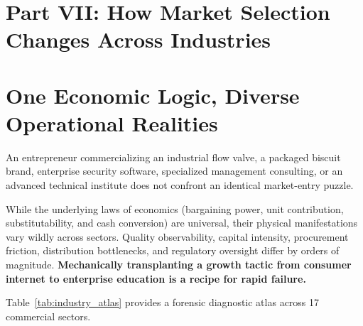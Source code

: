 \section*{Part VII: How Market Selection Changes Across Industries}

\section{One Economic Logic, Diverse Operational Realities}

An entrepreneur commercializing an industrial flow valve, a packaged biscuit brand, enterprise security software, specialized management consulting, or an advanced technical institute does not confront an identical market-entry puzzle.

While the underlying laws of economics (bargaining power, unit contribution, substitutability, and cash conversion) are universal, their physical manifestations vary wildly across sectors. Quality observability, capital intensity, procurement friction, distribution bottlenecks, and regulatory oversight differ by orders of magnitude. \textbf{Mechanically transplanting a growth tactic from consumer internet to enterprise education is a recipe for rapid failure.}

Table~\ref{tab:industry_atlas} provides a forensic diagnostic atlas across 17 commercial sectors.


